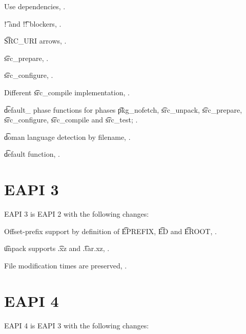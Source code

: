 \begin{compactitem}
\item Use dependencies, .
\item \t{!} and \t{!!} blockers, .
\item \t{SRC\_URI} arrows, .
\item \t{src\_prepare}, .
\item \t{src\_configure}, .
\item Different \t{src\_compile} implementation, .
\item \t{default\_} phase functions for phases \t{pkg\_nofetch}, \t{src\_unpack}, \t{src\_prepare},
    \t{src\_configure}, \t{src\_compile} and \t{src\_test}; .
\item \t{doman} language detection by filename, .
\item \t{default} function, .
\end{compactitem}

\section*{EAPI 3}

EAPI 3 is EAPI 2 with the following changes:
\begin{compactitem}
\item Offset-prefix support by definition of \t{EPREFIX}, \t{ED} and \t{EROOT},
    .
\item \t{unpack} supports \t{.xz} and \t{.tar.xz}, .
\item File modification times are preserved, .
\end{compactitem}

\section*{EAPI 4}

EAPI 4 is EAPI 3 with the following changes:

